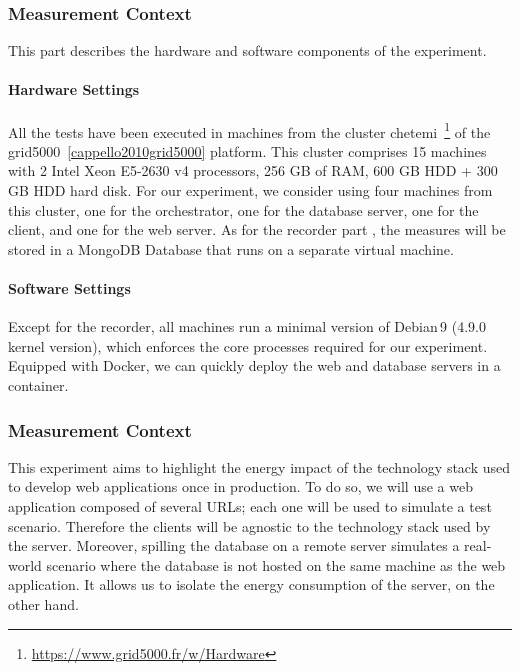 
\subsubsection*{Measurement Context}
This part describes the hardware and software components of the experiment.
\paragraph*{Hardware Settings}
All the tests have been executed in machines from the cluster \textsf{chetemi}~\footnote{\url{https://www.grid5000.fr/w/Hardware}} of the grid5000~\ref{cappello2010grid5000} platform.
This cluster comprises 15 machines with 2 Intel Xeon E5-2630 v4 processors, 256 GB of RAM,  600 GB HDD + 300 GB HDD hard disk.
For our experiment, we consider using four machines from this cluster, one for the orchestrator, one for the database server, one for the client, and one for the web server. As for the recorder part , the measures will be stored in a MongoDB Database that runs on a separate virtual machine.
\paragraph*{Software Settings}
Except for the recorder, all machines run a minimal version of Debian\,9 (4.9.0 kernel version), which enforces the core processes required for our experiment. Equipped with Docker, we can quickly deploy the web and database servers in a container.
\subsubsection{Measurement Context}
This experiment aims to highlight the energy impact of the technology stack used to develop web applications once in production.
To do so, we will use a web application composed of several URLs; each one will be used to simulate a test scenario. Therefore the clients will be agnostic to the technology stack used by the server.
Moreover, spilling the database on a remote server simulates a real-world scenario where the database is not hosted on the same machine as the web application. It allows us to isolate the energy consumption of the server, on the other hand.

